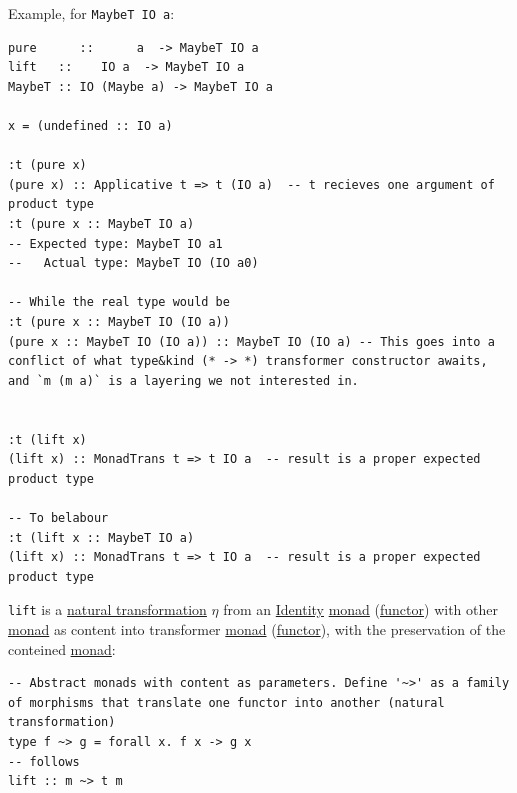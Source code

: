 \documentclass[a4paper,14pt,oneside]{book}
\begin{document}
Example, for \texttt{MaybeT IO a}:\\
\begin{verbatim}
pure      ::      a  -> MaybeT IO a
lift   ::    IO a  -> MaybeT IO a
MaybeT :: IO (Maybe a) -> MaybeT IO a

x = (undefined :: IO a)

:t (pure x)
(pure x) :: Applicative t => t (IO a)  -- t recieves one argument of product type
:t (pure x :: MaybeT IO a)
-- Expected type: MaybeT IO a1
--   Actual type: MaybeT IO (IO a0)

-- While the real type would be
:t (pure x :: MaybeT IO (IO a))
(pure x :: MaybeT IO (IO a)) :: MaybeT IO (IO a) -- This goes into a conflict of what type&kind (* -> *) transformer constructor awaits, and `m (m a)` is a layering we not interested in.


:t (lift x)
(lift x) :: MonadTrans t => t IO a  -- result is a proper expected product type

-- To belabour
:t (lift x :: MaybeT IO a)
(lift x) :: MonadTrans t => t IO a  -- result is a proper expected product type
\end{verbatim}

\texttt{lift} is a \hyperref[orga44d61c]{natural transformation} \(\eta\) from an \hyperref[org0c2b817]{Identity} \hyperref[org27993ff]{monad} (\hyperref[orgd7350b0]{functor}) with other \hyperref[org27993ff]{monad} as content into transformer \hyperref[org27993ff]{monad} (\hyperref[orgd7350b0]{functor}), with the preservation of the conteined \hyperref[org27993ff]{monad}:\\
\begin{verbatim}
-- Abstract monads with content as parameters. Define '~>' as a family of morphisms that translate one functor into another (natural transformation)
type f ~> g = forall x. f x -> g x
-- follows
lift :: m ~> t m
\end{verbatim}
\end{document}
